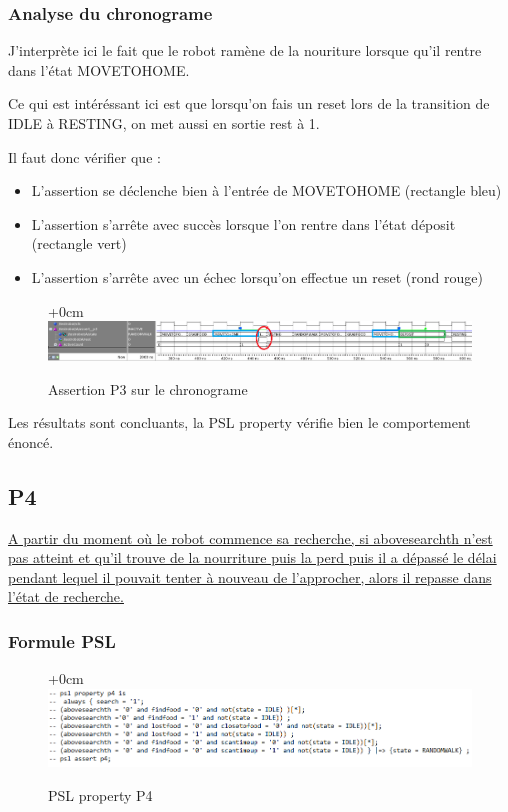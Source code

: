 \documentclass{article}
\newcommand{\sautligne}{
\textbf{\vspace{5mm}}
}
\begin{document}
\subsubsection{Analyse du chronograme}
J'interprète ici le fait que le robot ramène de la nouriture lorsque qu'il rentre dans l'état MOVETOHOME.
\sautligne

Ce qui est intéréssant ici est que lorsqu'on fais un reset lors de la transition de IDLE à RESTING, on met aussi en sortie rest à 1. 



Il faut donc vérifier que :

\begin{itemize}
\item  L'assertion se déclenche bien à l'entrée de MOVETOHOME (rectangle bleu)
\item L'assertion s'arrête avec succès lorsque l'on rentre dans l'état déposit (rectangle vert)
\item L'assertion s'arrête avec un échec lorsqu'on effectue un reset (rond rouge)
\end{itemize} 


\begin{figure}[!h]
\advance\leftskip+0cm
\includegraphics[scale=0.6]{PSL/P3-1.PNG}
\caption{Assertion P3 sur le chronograme }
\end{figure}


Les résultats sont concluants, la PSL property vérifie bien le comportement énoncé.

\newpage

\subsection{P4}
\uline{A partir du moment où le robot commence sa recherche, si abovesearchth n'est pas
atteint et qu'il trouve de la nourriture puis la perd puis il a dépassé le délai pendant lequel
il pouvait tenter à nouveau de l'approcher, alors il repasse dans l'état de recherche.}
\subsubsection{Formule PSL }
\begin{figure}[!h]
\advance\leftskip+0cm
\includegraphics[scale=0.7]{PSL/P4.PNG}
\caption{PSL property P4}
\end{figure}
\end{document}
